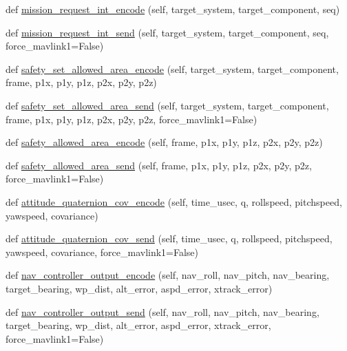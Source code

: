 \begin{DoxyCompactItemize}
\item 
def \hyperlink{classpymavlink_1_1dialects_1_1v10_1_1MAVLink_a6498818786001a6a083502b8c237da21}{mission\+\_\+request\+\_\+int\+\_\+encode} (self, target\+\_\+system, target\+\_\+component, seq)
\item 
def \hyperlink{classpymavlink_1_1dialects_1_1v10_1_1MAVLink_a52f3aeb73a023f06669b30cc4ddc93e2}{mission\+\_\+request\+\_\+int\+\_\+send} (self, target\+\_\+system, target\+\_\+component, seq, force\+\_\+mavlink1=False)
\item 
def \hyperlink{classpymavlink_1_1dialects_1_1v10_1_1MAVLink_a320b484260a0e9388364b6a0676368c9}{safety\+\_\+set\+\_\+allowed\+\_\+area\+\_\+encode} (self, target\+\_\+system, target\+\_\+component, frame, p1x, p1y, p1z, p2x, p2y, p2z)
\item 
def \hyperlink{classpymavlink_1_1dialects_1_1v10_1_1MAVLink_a68c8f968548a0478d793f49f452e4118}{safety\+\_\+set\+\_\+allowed\+\_\+area\+\_\+send} (self, target\+\_\+system, target\+\_\+component, frame, p1x, p1y, p1z, p2x, p2y, p2z, force\+\_\+mavlink1=False)
\item 
def \hyperlink{classpymavlink_1_1dialects_1_1v10_1_1MAVLink_a07fa89afec35939d13ac6aea990a5c8d}{safety\+\_\+allowed\+\_\+area\+\_\+encode} (self, frame, p1x, p1y, p1z, p2x, p2y, p2z)
\item 
def \hyperlink{classpymavlink_1_1dialects_1_1v10_1_1MAVLink_adff542695e56cd2979fa5556dc80c234}{safety\+\_\+allowed\+\_\+area\+\_\+send} (self, frame, p1x, p1y, p1z, p2x, p2y, p2z, force\+\_\+mavlink1=False)
\item 
def \hyperlink{classpymavlink_1_1dialects_1_1v10_1_1MAVLink_ac63cf70d2356bc63386d0d4a78592382}{attitude\+\_\+quaternion\+\_\+cov\+\_\+encode} (self, time\+\_\+usec, q, rollspeed, pitchspeed, yawspeed, covariance)
\item 
def \hyperlink{classpymavlink_1_1dialects_1_1v10_1_1MAVLink_a7eb3bf7ac23f879b0d55f77b642cc759}{attitude\+\_\+quaternion\+\_\+cov\+\_\+send} (self, time\+\_\+usec, q, rollspeed, pitchspeed, yawspeed, covariance, force\+\_\+mavlink1=False)
\item 
def \hyperlink{classpymavlink_1_1dialects_1_1v10_1_1MAVLink_a4f3119f89035afb45834e41bb4e97378}{nav\+\_\+controller\+\_\+output\+\_\+encode} (self, nav\+\_\+roll, nav\+\_\+pitch, nav\+\_\+bearing, target\+\_\+bearing, wp\+\_\+dist, alt\+\_\+error, aspd\+\_\+error, xtrack\+\_\+error)
\item 
def \hyperlink{classpymavlink_1_1dialects_1_1v10_1_1MAVLink_a06e03c33418b456391d5e27839ef8f74}{nav\+\_\+controller\+\_\+output\+\_\+send} (self, nav\+\_\+roll, nav\+\_\+pitch, nav\+\_\+bearing, target\+\_\+bearing, wp\+\_\+dist, alt\+\_\+error, aspd\+\_\+error, xtrack\+\_\+error, force\+\_\+mavlink1=False)

\end{DoxyCompactItemize}

